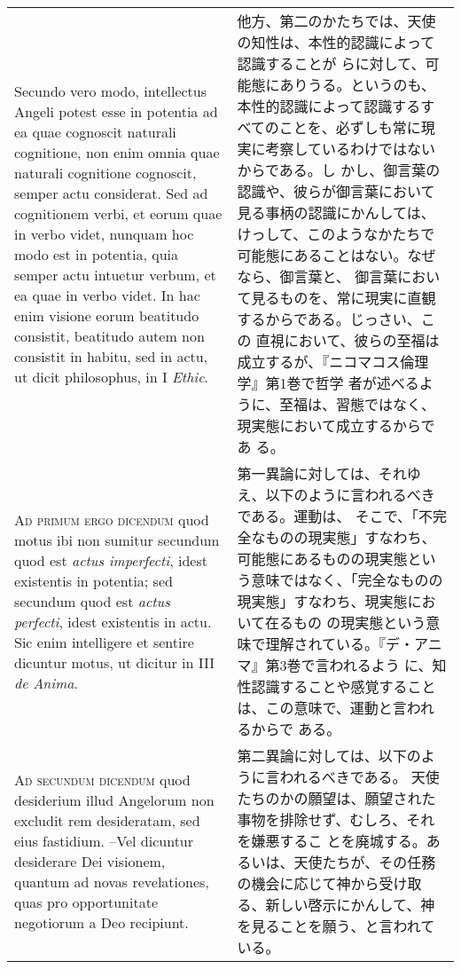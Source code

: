 \documentclass[10pt]{jsarticle} %
\begin{document}
\begin{longtable}{p{21em}p{21em}}
\\

Secundo vero modo, intellectus Angeli potest esse
in potentia ad ea quae cognoscit naturali cognitione, non enim omnia
quae naturali cognitione cognoscit, semper actu considerat. Sed ad
cognitionem verbi, et eorum quae in verbo videt, nunquam hoc modo est in
potentia, quia semper actu intuetur verbum, et ea quae in verbo
videt. In hac enim visione eorum beatitudo consistit, beatitudo autem
non consistit in habitu, sed in actu, ut dicit philosophus, in I {\itshape Ethic}.


&

他方、第二のかたちでは、天使の知性は、本性的認識によって認識することが
らに対して、可能態にありうる。というのも、本性的認識によって認識するす
べてのことを、必ずしも常に現実に考察しているわけではないからである。し
かし、御言葉の認識や、彼らが御言葉において見る事柄の認識にかんしては、
けっして、このようなかたちで可能態にあることはない。なぜなら、御言葉と、
御言葉において見るものを、常に現実に直観するからである。じっさい、この
直視において、彼らの至福は成立するが、『ニコマコス倫理学』第1巻で哲学
者が述べるように、至福は、習態ではなく、現実態において成立するからであ
る。


\\


{\scshape Ad primum ergo dicendum} quod motus ibi non
sumitur secundum quod est {\itshape actus imperfecti}, idest existentis in
potentia; sed secundum quod est {\itshape actus perfecti}, idest existentis in
actu. Sic enim intelligere et sentire dicuntur motus, ut dicitur in III
{\itshape de Anima}.


&

第一異論に対しては、それゆえ、以下のように言われるべきである。運動は、
そこで、「不完全なものの現実態」すなわち、可能態にあるものの現実態とい
う意味ではなく、「完全なものの現実態」すなわち、現実態において在るもの
の現実態という意味で理解されている。『デ・アニマ』第3巻で言われるよう
に、知性認識することや感覚することは、この意味で、運動と言われるからで
ある。


\\


{\scshape Ad secundum dicendum} quod desiderium illud
Angelorum non excludit rem desideratam, sed eius fastidium. --Vel dicuntur
desiderare Dei visionem, quantum ad novas revelationes, quas pro
opportunitate negotiorum a Deo recipiunt.


&

第二異論に対しては、以下のように言われるべきである。
天使たちのかの願望は、願望された事物を排除せず、むしろ、それを嫌悪するこ
とを廃城する。あるいは、天使たちが、その任務の機会に応じて神から受け取
る、新しい啓示にかんして、神を見ることを願う、と言われている。



\end{longtable}
\end{document}
